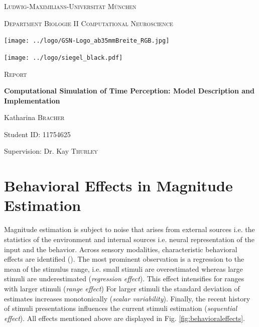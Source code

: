 \documentclass[9pt]{article}
\begin{document}

\begin{titlepage}
	\centering
	{\scshape\LARGE Ludwig-Maximilians-Universität München \par}
	{\scshape\large Department Biologie II Computational Neuroscience \par}
	\vspace{0.5cm}
	\texttt{[image: ../logo/GSN-Logo\_ab35mmBreite\_RGB.jpg]}\par
	\texttt{[image: ../logo/siegel\_black.pdf]}\par
	\vspace{0.7cm}
	{\scshape\LARGE Report \par}
	\vspace{0.05cm}
	{\huge\bfseries Computational Simulation of Time Perception: Model Description and Implementation \par}
	\vspace{1.1cm}
	{\Large Katharina \textsc{Bracher} \par}
	{Student ID: 11754625 \par}
	\vspace{0.4cm}
	{\large Supervision: Dr. Kay \textsc{Thurley} \par}
\end{titlepage}


\normalsize
\tableofcontents


\section{Behavioral Effects in Magnitude Estimation}
Magnitude estimation is subject to noise that arises from external sources i.e. the statistics of the environment and internal sources i.e. neural representation of the input and the behavior.
Across sensory modalities, characteristic behavioral effects are identified (\cite{Petzschner2015}).
The most prominent observation is a regression to the mean of the stimulus range,  i.e. small stimuli are overestimated whereas large stimuli are underestimated (\textit{regression effect}). 
This effect intensifies for ranges with larger stimuli (\textit{range effect})
For larger stimuli the standard deviation of estimates increases monotonically (\textit{scalar variability}). 
Finally, the recent history of stimuli presentations influences the current stimuli estimation (\textit{sequential effect}).
All effects mentioned above are displayed in Fig. \ref{fig:behavioraleffects}. 
\end{document}
